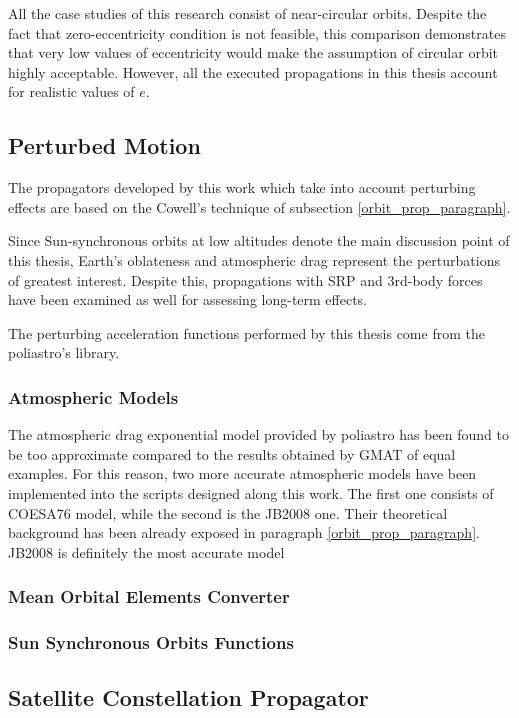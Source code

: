 All the case studies of this research consist of near-circular orbits.
Despite the fact that zero-eccentricity condition is not feasible, this comparison demonstrates that very low values of eccentricity would make the assumption of circular orbit highly acceptable.
However, all the executed propagations in this thesis account for realistic values of $e$.  


\subsection{Perturbed Motion}
The propagators developed by this work which take into account perturbing effects are based on the Cowell's technique of subsection \ref{orbit_prop_paragraph}.

Since Sun-synchronous orbits at low altitudes denote the main discussion point of this thesis, Earth's oblateness and atmospheric drag represent the perturbations of greatest interest. 
Despite this, propagations with SRP and 3rd-body forces have been examined as well for assessing long-term effects. 

The perturbing acceleration functions performed by this thesis come from the poliastro's library.


\subsubsection{Atmospheric Models}
The atmospheric drag exponential model provided by poliastro has been found to be too approximate compared to the results obtained by GMAT of equal examples.
For this reason, two more accurate atmospheric models have been implemented into the scripts designed along this work.
The first one consists of COESA76 model, while the second is the JB2008 one.
Their theoretical background has been already exposed in paragraph \ref{orbit_prop_paragraph}.
JB2008 is definitely the most accurate model


\subsubsection{Mean Orbital Elements Converter}


\subsubsection{Sun Synchronous Orbits Functions}


\subsection{Satellite Constellation Propagator}



